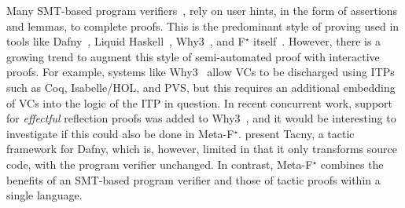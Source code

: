 \documentclass[runningheads]{llncs}
\newcommand\fstar{F$^\star$\xspace}
\newcommand\metafstar{Meta-F$^\star$\xspace}
\begin{document}
Many SMT-based program verifiers~\cite{BarnettCDJL05,
BurdyCCEKLLP05, BarnettDFJLSV05, FlanaganLLNSS13, LeinoN98},
%
%
rely on user hints, in the form of assertions and lemmas, to complete proofs.
This is the predominant style of proving
used in tools like Dafny~\cite{leino10dafny}, Liquid Haskell~\cite{VazouTCSNWJ18}, Why3~\cite{filliatre13why3}, and \fstar
itself~\cite{mumon}.
%
%
%
However, there is a growing trend to augment this style of semi-automated proof with interactive proofs.
For example, systems like Why3~\cite{filliatre13why3} allow
VCs to be discharged
using ITPs such as Coq, Isabelle/HOL, and PVS, but this requires
an additional embedding of VCs into the logic of the ITP in question.
%
In recent concurrent work, support for {\em effectful} reflection
proofs was added to Why3~\cite{why3reflection}, and it would be
interesting to investigate if this could also be done in \metafstar.
%
\citet{GrovT16} present Tacny, a tactic framework for Dafny,
which is, however, limited in that it only transforms source code,
with the program verifier unchanged.
%
In contrast, \metafstar{} combines the benefits of an SMT-based
program verifier and those of tactic proofs within a single language.
\end{document}
